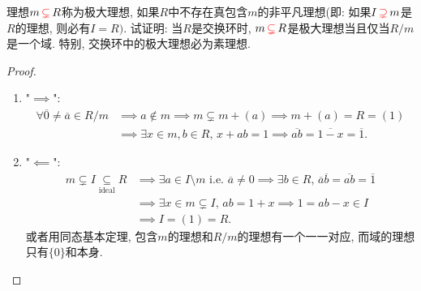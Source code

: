 \begin{problem}\label{ex:2.1.6}
    理想$m \,\textcolor{red}{\subsetneq}\, R$称为极大理想, 如果$R$中不存在真包含$m$的非平凡理想(即: 如果$I \,\textcolor{red}{\supsetneq}\, m$是$R$的理想, 则必有$I = R)$. 试证明: 当$R$是交换环时, $m \,\textcolor{red}{\subsetneq}\, R$是极大理想当且仅当$R/m$是一个域. 特别, 交换环中的极大理想必为素理想.
\end{problem}

\begin{proof}
    \begin{enumerate}[(1)]
        \item "$\implies$":
        \[
        \begin{aligned}
            \forall \overline{0} \neq \overline{a} \in R/m &\implies a \notin m \implies m \subsetneq m + (a) \implies m + (a) = R = (1)\\
            &\implies \exists x \in m, b \in R,\, x + ab = 1 \implies \overline{ab} = \overline{1 - x} = \overline{1}.
        \end{aligned}
        \]
        \item "$\impliedby$":
        \[
        \begin{aligned}
            m \subsetneq I \underset{\text{ideal}}{\subseteq} R &\implies \exists a \in I \setminus m \text{ i.e. } \overline{a} \neq 0 \implies \exists b \in R,\, \overline{a}\overline{b} = \overline{ab} = \overline{1}\\
            &\implies \exists x \in m \subsetneq I,\, ab = 1 + x \implies 1 = ab - x \in I \\
            &\implies I = (1) = R.
        \end{aligned}
        \]
        或者用同态基本定理, 包含$m$的理想和$R/m$的理想有一个一一对应, 而域的理想只有$\{0\}$和本身.
    \end{enumerate}
\end{proof}


